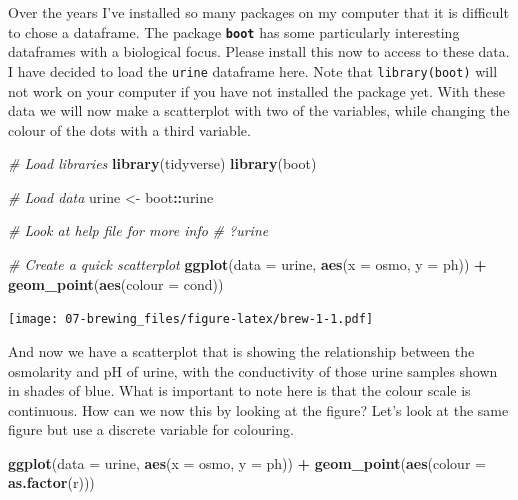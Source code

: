 \documentclass[
]{book}
\newenvironment{Shaded}{\begin{snugshade}}{\end{snugshade}}
\newcommand{\CommentTok}[1]{\textcolor[rgb]{0.56,0.35,0.01}{\textit{#1}}}
\newcommand{\DataTypeTok}[1]{\textcolor[rgb]{0.13,0.29,0.53}{#1}}
\newcommand{\KeywordTok}[1]{\textcolor[rgb]{0.13,0.29,0.53}{\textbf{#1}}}
\newcommand{\NormalTok}[1]{#1}
\newcommand{\OperatorTok}[1]{\textcolor[rgb]{0.81,0.36,0.00}{\textbf{#1}}}
\newcommand{\StringTok}[1]{\textcolor[rgb]{0.31,0.60,0.02}{#1}}
\begin{document}
Over the years I've installed so many packages on my computer that it is difficult to chose a dataframe. The package \textbf{\texttt{boot}} has some particularly interesting dataframes with a biological focus. Please install this now to access to these data. I have decided to load the \texttt{urine} dataframe here. Note that \texttt{library(boot)} will not work on your computer if you have not installed the package yet. With these data we will now make a scatterplot with two of the variables, while changing the colour of the dots with a third variable.

\begin{Shaded}
\begin{Highlighting}[]
\CommentTok{\# Load libraries}
\KeywordTok{library}\NormalTok{(tidyverse)}
\KeywordTok{library}\NormalTok{(boot)}

\CommentTok{\# Load data}
\NormalTok{urine <{-}}\StringTok{ }\NormalTok{boot}\OperatorTok{::}\NormalTok{urine}

\CommentTok{\# Look at help file for more info}
\CommentTok{\# ?urine}

\CommentTok{\# Create a quick scatterplot}
\KeywordTok{ggplot}\NormalTok{(}\DataTypeTok{data =}\NormalTok{ urine, }\KeywordTok{aes}\NormalTok{(}\DataTypeTok{x =}\NormalTok{ osmo, }\DataTypeTok{y =}\NormalTok{ ph)) }\OperatorTok{+}
\StringTok{  }\KeywordTok{geom\_point}\NormalTok{(}\KeywordTok{aes}\NormalTok{(}\DataTypeTok{colour =}\NormalTok{ cond))}
\end{Highlighting}
\end{Shaded}

\texttt{[image: 07-brewing\_files/figure-latex/brew-1-1.pdf]}

And now we have a scatterplot that is showing the relationship between the osmolarity and pH of urine, with the conductivity of those urine samples shown in shades of blue. What is important to note here is that the colour scale is continuous. How can we now this by looking at the figure? Let's look at the same figure but use a discrete variable for colouring.

\begin{Shaded}
\begin{Highlighting}[]
\KeywordTok{ggplot}\NormalTok{(}\DataTypeTok{data =}\NormalTok{ urine, }\KeywordTok{aes}\NormalTok{(}\DataTypeTok{x =}\NormalTok{ osmo, }\DataTypeTok{y =}\NormalTok{ ph)) }\OperatorTok{+}
\StringTok{  }\KeywordTok{geom\_point}\NormalTok{(}\KeywordTok{aes}\NormalTok{(}\DataTypeTok{colour =} \KeywordTok{as.factor}\NormalTok{(r)))}
\end{Highlighting}
\end{Shaded}
\end{document}
